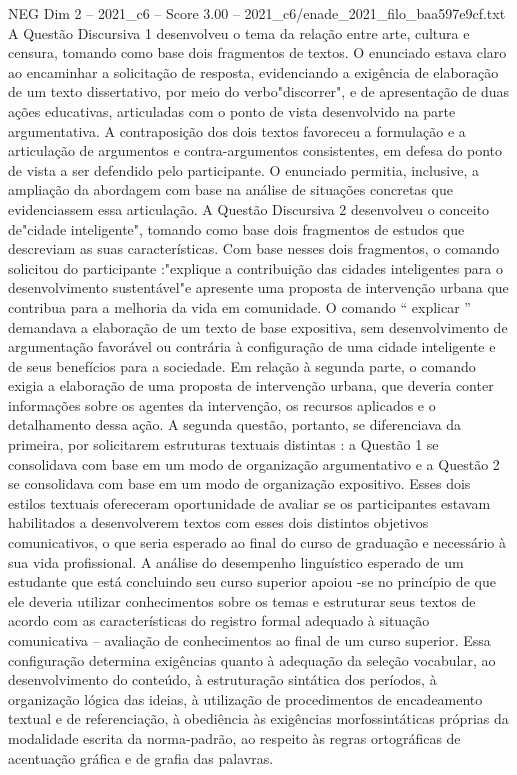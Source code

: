 \begin{textsample}{NEG Dim 2 – 2021\_c6 – Score 3.00 – 2021\_c6/enade\_2021\_filo\_baa597e9cf.txt}
A Questão Discursiva 1 desenvolveu o tema da relação entre arte, cultura e censura, tomando como base dois fragmentos de textos.
O enunciado estava claro ao encaminhar a solicitação de resposta, evidenciando a exigência de elaboração de um texto dissertativo, por meio do verbo"discorrer", e de apresentação de duas ações educativas, articuladas com o ponto de vista desenvolvido na parte argumentativa.
A contraposição dos dois textos favoreceu a formulação e a articulação de argumentos e contra-argumentos consistentes, em defesa do ponto de vista a ser defendido pelo participante.
O enunciado permitia, inclusive, a ampliação da abordagem com base na análise de situações concretas que evidenciassem essa articulação.
A Questão Discursiva 2 desenvolveu o conceito de"cidade inteligente", tomando como base dois fragmentos de estudos que descreviam as suas características.
Com base nesses dois fragmentos, o comando solicitou do participante :"explique a contribuição das cidades inteligentes para o desenvolvimento sustentável"e apresente uma proposta de intervenção urbana que contribua para a melhoria da vida em comunidade.
O comando “ explicar ” demandava a elaboração de um texto de base expositiva, sem desenvolvimento de argumentação favorável ou contrária à configuração de uma cidade inteligente e de seus benefícios para a sociedade.
Em relação à segunda parte, o comando exigia a elaboração de uma proposta de intervenção urbana, que deveria conter informações sobre os agentes da intervenção, os recursos aplicados e o detalhamento dessa ação.
A segunda questão, portanto, se diferenciava da primeira, por solicitarem estruturas textuais distintas : a Questão 1 se consolidava com base em um modo de organização argumentativo e a Questão 2 se consolidava com base em um modo de organização expositivo.
Esses dois estilos textuais ofereceram oportunidade de avaliar se os participantes estavam habilitados a desenvolverem textos com esses dois distintos objetivos comunicativos, o que seria esperado ao final do curso de graduação e necessário à sua vida profissional.
A análise do desempenho linguístico esperado de um estudante que está concluindo seu curso superior apoiou -se no princípio de que ele deveria utilizar conhecimentos sobre os temas e estruturar seus textos de acordo com as características do registro formal adequado à situação comunicativa – avaliação de conhecimentos ao final de um curso superior.
Essa configuração determina exigências quanto à adequação da seleção vocabular, ao desenvolvimento do conteúdo, à estruturação sintática dos períodos, à organização lógica das ideias, à utilização de procedimentos de encadeamento textual e de referenciação, à obediência às exigências morfossintáticas próprias da modalidade escrita da norma-padrão, ao respeito às regras ortográficas de acentuação gráfica e de grafia das palavras.

\end{textsample}
